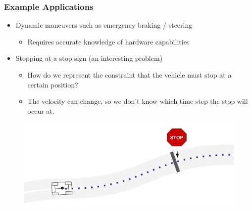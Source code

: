 \documentclass{beamer}
\begin{document}
\begin{frame}
\frametitle{Example Applications}
\begin{itemize}
	\item Dynamic maneuvers such as emergency braking / steering
	\begin{itemize}
		\item Requires accurate knowledge of hardware capabilities
	\end{itemize}
	\item Stopping at a stop sign (an interesting problem)
	\begin{itemize}
		\item How do we represent the constraint that the vehicle must stop at a certain position?
		\item The velocity can change, so we don't know which time step the stop will occur at.
	\end{itemize}
\end{itemize}
\begin{figure}
	\includegraphics[width=0.7\linewidth]{figures/stop_sign.png}
\end{figure}


\end{frame}

	

	
	
\end{document}
